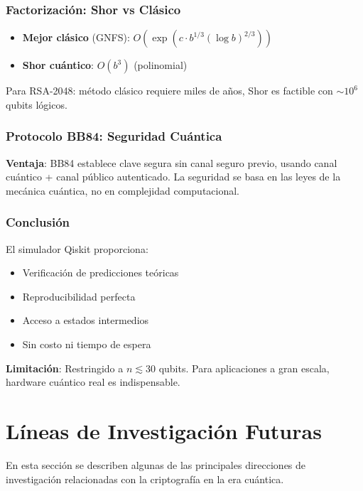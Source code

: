 \documentclass[12pt]{article}
\begin{document}
\subsubsection{Factorización: Shor vs Clásico}

\begin{itemize}
    \item \textbf{Mejor clásico} (GNFS): $O(\exp(c \cdot b^{1/3} (\log b)^{2/3}))$
    \item \textbf{Shor cuántico}: $O(b^3)$ (polinomial)
\end{itemize}

Para RSA-2048: método clásico requiere miles de años, Shor es factible con $\sim 10^6$ qubits lógicos.

\subsubsection{Protocolo BB84: Seguridad Cuántica}

\textbf{Ventaja}: BB84 establece clave segura sin canal seguro previo, usando canal cuántico + canal público autenticado. La seguridad se basa en las leyes de la mecánica cuántica, no en complejidad computacional.

\subsubsection{Conclusión}

El simulador Qiskit proporciona:
\begin{itemize}
    \item \checkmark Verificación de predicciones teóricas
    \item \checkmark Reproducibilidad perfecta
    \item \checkmark Acceso a estados intermedios
    \item \checkmark Sin costo ni tiempo de espera
\end{itemize}

\textbf{Limitación}: Restringido a $n \lesssim 30$ qubits. Para aplicaciones a gran escala, hardware cuántico real es indispensable.



\section{Líneas de Investigación Futuras}
En esta sección se describen algunas de las principales direcciones de investigación relacionadas con la criptografía en la era cuántica.
\end{document}
